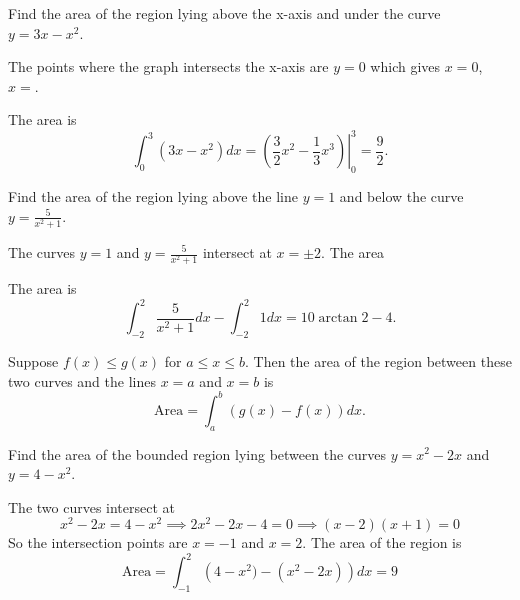\documentclass[calc1-main.tex]{subfiles}
\begin{document}
\begin{example}
  Find the area of the region lying above the x-axis and under the curve $y=3x-x^2$.
\end{example}
\begin{minipage}{0.5\textwidth}
  \begin{solution}
    The points where the graph intersects the x-axis are $y=0$ which gives $x=0$, $x=$.

    The area is
    \[
      \int_0^3 (3x-x^2) dx = \left. \left( \frac{3}{2}x^2 - \frac{1}{3}x^3 \right) \right\vert_0^3 = \frac{9}{2}.
    \]
  \end{solution}
\end{minipage}%
\begin{minipage}{0.5\textwidth}
  \begin{figure}[H]
    \centering
    
  \end{figure}
\end{minipage}

\begin{example}
  Find the area of the region lying above the line $y=1$ and below the curve $y=\frac{5}{x^2+1}$.
\end{example}
\begin{minipage}{0.5\textwidth}
  \begin{solution}
    The curves $y=1$ and $y=\frac{5}{x^2+1}$ intersect at $x=\pm 2$. The area

    The area is
    \[
      \int_{-2}^2 \frac{5}{x^2+1} dx - \int_{-2}^2 1 dx = 10 \arctan 2 - 4.
    \]
  \end{solution}
\end{minipage}%
\begin{minipage}{0.5\textwidth}
  \begin{figure}[H]
    \centering
    
  \end{figure}
\end{minipage}

Suppose $f(x) \le g(x)$ for $a \le x \le b$. Then the area of the region between these two curves and the lines $x=a$ and $x=b$ is
\[
	\text{Area} = \int_a^b (g(x) - f(x)) dx.
\]
\begin{example}
	Find the area of the bounded region lying between the curves $y=x^2 - 2x$ and $y= 4-x^2$.
\end{example}

\begin{minipage}{0.5\textwidth}
	\begin{solution}
		The two curves intersect at
		\[
			x^2-2x = 4-x^2 \implies 2x^2 - 2x - 4 = 0 \implies (x-2)(x+1) = 0
		\]
		So the intersection points are $x=-1$ and $x=2$.
		The area of the region is
		\[
			\text{Area} = \int_{-1}^2 \left(4-x^2) - (x^2 - 2x)  \right) dx = 9
		\]

	\end{solution}
\end{minipage}%
\begin{minipage}{0.5\textwidth}
  \begin{figure}[H]
	\centering
	
\end{figure}
\end{minipage}
\end{document}
